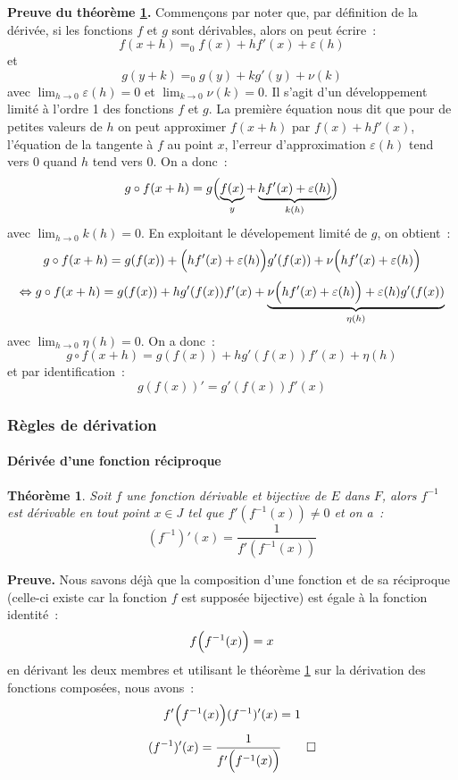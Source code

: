 \documentclass[10pt,notheorems]{beamer}
\theoremstyle{plain}
\newtheorem{theorem}{Théorème}
\theoremstyle{definition} %
\begin{document}
\begin{notes}
  \textbf{Preuve du théorème \hyperlink{slide_derivee_composition_1}{\ref{thm:composition}}.} Commençons par noter que, par définition de la dérivée, si les fonctions $f$ et $g$ sont dérivables, alors on peut écrire~:
  \[
    f(x+h) =_0 f(x) + hf'(x) + \varepsilon(h)
  \]
  et
  \[
    g(y+k) =_0 g(y) + kg'(y) + \nu(k)
  \]
  avec $\lim_{h\rightarrow 0}\varepsilon(h)=0$ et $\lim_{k\rightarrow 0}\nu(k)=0$. Il s'agit d'un développement limité à l'ordre 1 des fonctions $f$ et $g$. La première équation nous dit que pour de petites valeurs de $h$ on peut approximer $f(x+h)$ par $f(x) + hf'(x)$, l'équation de la tangente à $f$ au point $x$, l'erreur d'approximation $\varepsilon(h)$ tend vers 0 quand $h$ tend vers 0. On a donc~:
  \[
    g\circ f(x+h) = g\Bigl(\underbrace{f(x)}_{y}+\underbrace{hf'(x) + \varepsilon(h)}_{k(h)}\Bigr)
  \]
  avec $\lim_{h\rightarrow 0}k(h) = 0$. En exploitant le dévelopement limité de $g$, on obtient~:
  \[
    g\circ f(x+h) = g(f(x)) + \Bigl( hf'(x) + \varepsilon(h) \Bigr) g'(f(x)) + \nu\Bigl( hf'(x) + \varepsilon(h) \Bigr)
  \]
  \[
    \Leftrightarrow g\circ f(x+h) = g(f(x)) + h g'(f(x))f'(x) + \underbrace{\nu\Bigl( hf'(x) + \varepsilon(h) \Bigr)+\varepsilon(h)g'(f(x))}_{\eta(h)}
  \]
  avec $\lim_{h\rightarrow 0}\eta(h) = 0$. On a donc~:
  \[
    g\circ f(x+h) = g(f(x)) + h g'(f(x))f'(x) + \eta(h)
  \]
  et par identification~:
  \[
    g(f(x))' = g'(f(x))f'(x)
  \]

\end{notes}


\begin{frame}
  \frametitle{Règles de dérivation}
  \framesubtitle{Dérivée d'une fonction réciproque}
  \hypertarget{slide_derivee_reciproque_1}{}

  \begin{theorem}\label{thm:composition}
    Soit $f$ une fonction dérivable et bijective de $E$ dans $F$, alors $f^{-1}$ est dérivable en tout point $x\in J$ tel que $f'(f^{-1}(x))\neq 0$ et on a~:
    \[
      (f^{-1})'(x) = \frac{1}{f'(f^{-1}(x))}
    \]
  \end{theorem}

  \bigskip

  {\small \textbf{Preuve.} Nous savons déjà que la composition d'une fonction et de sa réciproque (celle-ci existe car la fonction $f$ est supposée bijective) est égale à la fonction identité~:
    \[
      f\Bigl(f^{-1}(x)\Bigr) = x
    \]
    en dérivant les deux membres et utilisant le théorème \hyperlink{slide_derivee_composition_1}{\ref{thm:composition}} sur la dérivation des fonctions composées, nous avons~:
    \[
      f'\Bigl(f^{-1}(x)\Bigr)(f^{-1})'(x)  = 1
    \]
    \[
      (f^{-1})'(x)  = \frac{1}{f'\Bigl(f^{-1}(x)\Bigr)}\qed
    \]
  }

\end{frame}
\end{document}
